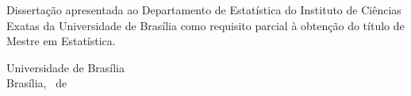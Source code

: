 \newpage
\begin{center}
\bf
\autor

\setlength{\baselineskip}{0.8cm}

\vspace{2.0cm}
\centering{\bf \Large \titulo}

\doublespacing
\normalfont

\vspace{7cm}
\begin{flushright}
\begin{minipage}{8cm}
 \parbox[t]{8cm}{Dissertação apresentada ao Departamento de Estatística do Instituto de Ciências Exatas da Universidade de Brasília como requisito parcial à obtenção do título de Mestre em Estatística.}
\end{minipage}
\end{flushright}

\onehalfspacing
\bf

\vspace{8cm}
Universidade de Brasília \\
Brasília, \mes\ de \ano
\end{center}
